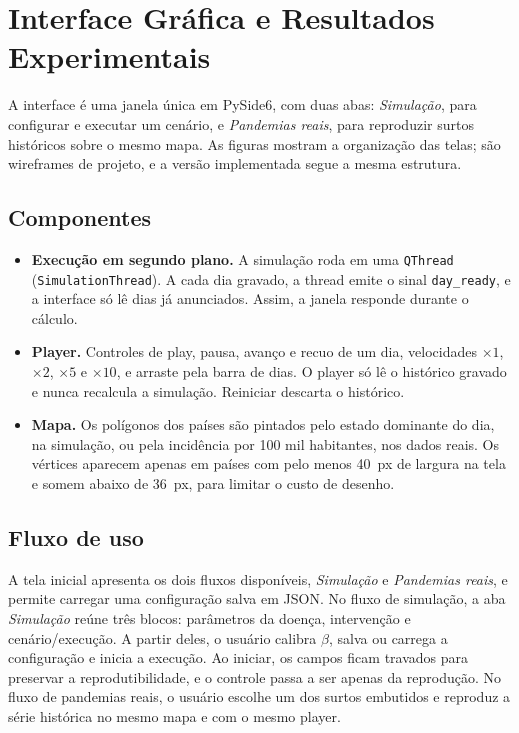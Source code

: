 \documentclass[11pt]{article}
\begin{document}
\section{Interface Gráfica e Resultados Experimentais} \label{sec:interface}

A interface é uma janela única em PySide6, com duas abas: \emph{Simulação}, para configurar e executar um cenário, e \emph{Pandemias reais}, para reproduzir surtos históricos sobre o mesmo mapa. As figuras mostram a organização das telas; são wireframes de projeto, e a versão implementada segue a mesma estrutura.

\subsection{Componentes}

\begin{itemize}
\item \textbf{Execução em segundo plano.} A simulação roda em uma \texttt{QThread} (\texttt{SimulationThread}). A cada dia gravado, a thread emite o sinal \texttt{day\_ready}, e a interface só lê dias já anunciados. Assim, a janela responde durante o cálculo.
\item \textbf{Player.} Controles de play, pausa, avanço e recuo de um dia, velocidades $\times 1$, $\times 2$, $\times 5$ e $\times 10$, e arraste pela barra de dias. O player só lê o histórico gravado e nunca recalcula a simulação. Reiniciar descarta o histórico.
\item \textbf{Mapa.} Os polígonos dos países são pintados pelo estado dominante do dia, na simulação, ou pela incidência por 100 mil habitantes, nos dados reais. Os vértices aparecem apenas em países com pelo menos 40~px de largura na tela e somem abaixo de 36~px, para limitar o custo de desenho.
\end{itemize}

\subsection{Fluxo de uso}

A tela inicial apresenta os dois fluxos disponíveis, \emph{Simulação} e \emph{Pandemias reais}, e permite carregar uma configuração salva em JSON. No fluxo de simulação, a aba \emph{Simulação} reúne três blocos: parâmetros da doença, intervenção e cenário/execução. A partir deles, o usuário calibra $\beta$, salva ou carrega a configuração e inicia a execução. Ao iniciar, os campos ficam travados para preservar a reprodutibilidade, e o controle passa a ser apenas da reprodução. No fluxo de pandemias reais, o usuário escolhe um dos surtos embutidos e reproduz a série histórica no mesmo mapa e com o mesmo player.
\end{document}

